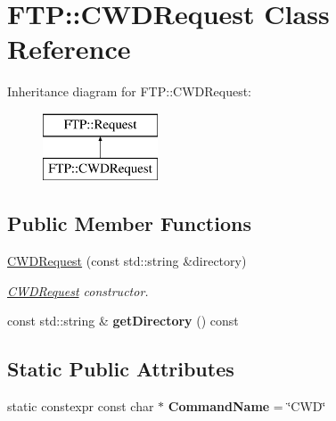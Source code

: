 \hypertarget{class_f_t_p_1_1_c_w_d_request}{\section{F\-T\-P\-:\-:C\-W\-D\-Request Class Reference}
\label{class_f_t_p_1_1_c_w_d_request}
}
Inheritance diagram for F\-T\-P\-:\-:C\-W\-D\-Request\-:\begin{figure}[H]
\begin{center}
\leavevmode
\includegraphics[height=2.000000cm]{class_f_t_p_1_1_c_w_d_request}
\end{center}
\end{figure}
\subsection*{Public Member Functions}
\begin{DoxyCompactItemize}
\item 
\hyperlink{class_f_t_p_1_1_c_w_d_request_a091feea182bab2dd9a7b4fd5d4d3decc}{C\-W\-D\-Request} (const std\-::string \&directory)
\begin{DoxyCompactList}\small\item\em \hyperlink{class_f_t_p_1_1_c_w_d_request}{C\-W\-D\-Request} constructor. \end{DoxyCompactList}\item 
\hypertarget{class_f_t_p_1_1_c_w_d_request_a1206a80f13f5690af449ddc409bbee95}{const std\-::string \& {\bfseries get\-Directory} () const }\label{class_f_t_p_1_1_c_w_d_request_a1206a80f13f5690af449ddc409bbee95}

\end{DoxyCompactItemize}
\subsection*{Static Public Attributes}
\begin{DoxyCompactItemize}
\item 
\hypertarget{class_f_t_p_1_1_c_w_d_request_a9985962b0f7a8b28c49020d37e509b7d}{static constexpr const char $\ast$ {\bfseries Command\-Name} = \char`\"{}C\-W\-D\char`\"{}}\label{class_f_t_p_1_1_c_w_d_request_a9985962b0f7a8b28c49020d37e509b7d}

\end{DoxyCompactItemize}


